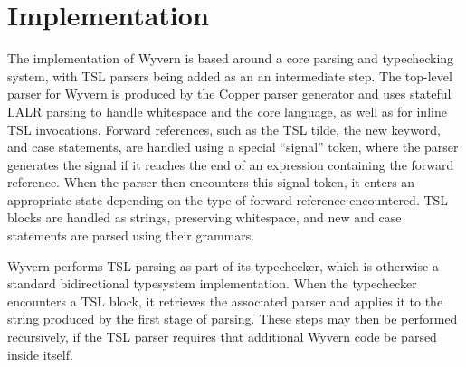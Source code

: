 
\section{Implementation}
\label{s:implementation}
The implementation of Wyvern is based around a core parsing and typechecking system, with TSL parsers being added as an an intermediate step. The top-level parser for Wyvern is produced by the Copper parser generator %
and uses stateful LALR parsing to handle whitespace and the core language, as well as for inline TSL invocations. Forward references, such as the TSL tilde, the new keyword, and case statements, are handled using a special ``signal'' token, where the parser generates the signal if it reaches the end of an expression containing the forward reference. When the parser then encounters this signal token, it enters an appropriate state depending on the type of forward reference encountered. TSL blocks are handled as strings, preserving whitespace, and new and case statements are parsed using their grammars.

Wyvern performs TSL parsing as part of its typechecker, which is otherwise a standard bidirectional typesystem implementation. When the typechecker encounters a TSL block, it retrieves the associated parser and applies it to the string produced by the first stage of parsing. These steps may then be performed recursively, if the TSL parser requires that additional Wyvern code be parsed inside itself. 